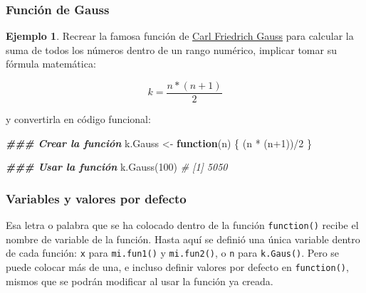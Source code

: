 \documentclass[
]{article}
\newenvironment{Shaded}{\begin{snugshade}}{\end{snugshade}}
\newcommand{\CommentTok}[1]{\textcolor[rgb]{0.56,0.35,0.01}{\textit{#1}}}
\newcommand{\ControlFlowTok}[1]{\textcolor[rgb]{0.13,0.29,0.53}{\textbf{#1}}}
\newcommand{\DecValTok}[1]{\textcolor[rgb]{0.00,0.00,0.81}{#1}}
\newcommand{\DocumentationTok}[1]{\textcolor[rgb]{0.56,0.35,0.01}{\textbf{\textit{#1}}}}
\newcommand{\FunctionTok}[1]{\textcolor[rgb]{0.00,0.00,0.00}{#1}}
\newcommand{\NormalTok}[1]{#1}
\newcommand{\OtherTok}[1]{\textcolor[rgb]{0.56,0.35,0.01}{#1}}
\newcommand{\SpecialCharTok}[1]{\textcolor[rgb]{0.00,0.00,0.00}{#1}}
\theoremstyle{definition}
\theoremstyle{definition}
\newtheorem{example}{Ejemplo}[section]
\theoremstyle{definition}
\theoremstyle{definition}
\theoremstyle{remark}
\begin{document}
\hypertarget{funciuxf3n-de-gauss}{%
\subsubsection{Función de Gauss}\label{funciuxf3n-de-gauss}}

\begin{example}

Recrear la famosa función de \href{https://es.wikipedia.org/wiki/Carl_Friedrich_Gauss}{Carl Friedrich Gauss} para calcular la suma de todos los números dentro de un rango numérico, implicar tomar su fórmula matemática:

\[ k = \frac{n * ( n + 1 )}{2} \]

y convertirla en código funcional:

\begin{Shaded}
\begin{Highlighting}[]
\DocumentationTok{\#\#\# Crear la función}
\NormalTok{k.Gauss }\OtherTok{\textless{}{-}} \ControlFlowTok{function}\NormalTok{(n) \{}
\NormalTok{  (n }\SpecialCharTok{*}\NormalTok{ (n}\SpecialCharTok{+}\DecValTok{1}\NormalTok{))}\SpecialCharTok{/}\DecValTok{2}
\NormalTok{\}}

\DocumentationTok{\#\#\# Usar la función}
\FunctionTok{k.Gauss}\NormalTok{(}\DecValTok{100}\NormalTok{)}
\CommentTok{\# [1] 5050}
\end{Highlighting}
\end{Shaded}

\end{example}

\hypertarget{variables-y-valores-por-defecto}{%
\subsubsection{Variables y valores por defecto}\label{variables-y-valores-por-defecto}}

Esa letra o palabra que se ha colocado dentro de la función \texttt{function()} recibe el nombre de variable de la función. Hasta aquí se definió una única variable dentro de cada función: \texttt{x} para \texttt{mi.fun1()} y \texttt{mi.fun2()}, o \texttt{n} para \texttt{k.Gaus()}. Pero se puede colocar más de una, e incluso definir valores por defecto en \texttt{function()}, mismos que se podrán modificar al usar la función ya creada.
\end{document}
